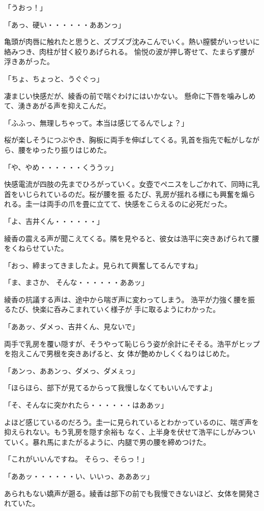 ﻿\documentclass[book,tate]{jlreq}
\begin{document}
「うおっ！」

「あっ、硬い・・・・・・ああンっ」

亀頭が肉唇に触れたと思うと、ズブズブ沈みこんでいく。熱い膣襞がいっせいに絡みつき、肉柱が甘く絞りあげられる。 愉悦の波が押し寄せて、たまらず腰が浮きあがった。

「ちょ、ちょっと、うぐぐっ」

凄まじい快感だが、綾香の前で喘ぐわけにはいかない。 懸命に下唇を噛みしめて、湧きあがる声を抑えこんだ。

「ふふっ、無理しちゃって。本当は感じてるんでしょ？」

桜が楽しそうにつぶやき、胸板に両手を伸ばしてくる。乳首を指先で転がしながら、腰をゆったり振りはじめた。

「や、やめ・・・・・・くううッ」

快感電流が四肢の先までひろがっていく。女壺でペニスをしごかれて、同時に乳首をいじられているのだ。桜が腰を振 るたび、乳房が揺れる様にも興奮を煽られる。圭一は両手の爪を畳に立てて、快感をこらえるのに必死だった。

「よ、吉井くん・・・・・・」

綾香の震える声が聞こえてくる。隣を見やると、彼女は浩平に突きあげられて腰をくねらせていた。

「おっ、締まってきましたよ。見られて興奮してるんですね」

「ま、まさか、 そんな・・・・・・ああッ」

綾香の抗議する声は、途中から喘ぎ声に変わってしまう。 浩平が力強く腰を振るたび、快楽に呑みこまれていく様子が 手に取るようにわかった。

「ああッ、ダメっ、吉井くん、見ないで」

両手で乳房を覆い隠すが、そうやって恥じらう姿が余計にそそる。浩平がヒップを抱えこんで男根を突きあげると、女 体が艶めかしくくねりはじめた。

「あンっ、ああンっ、ダメっ、ダメぇっ」

「ほらほら、部下が見てるからって我慢しなくてもいいんですよ」

「そ、そんなに突かれたら・・・・・・はああッ」

よほど感じているのだろう。圭一に見られているとわかっているのに、喘ぎ声を抑えられない。もう乳房を隠す余裕も なく、上半身を伏せて浩平にしがみついていく。暴れ馬にまたがるように、内腿で男の腰を締めつけた。

「これがいいんですね。 そらっ、そらっ！」

「ああッ・・・・・・い、いいっ、あああッ」

あられもない嬌声が遡る。綾香は部下の前でも我慢できないほど、女体を開発されていた。
\end{document}
